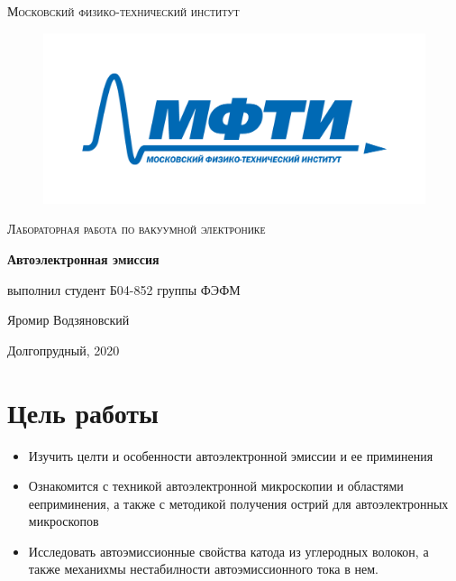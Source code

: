 \documentclass[a4paper]{article}
\begin{document}
\newcommand{\apple}{\char"F8FF}

\begin{titlepage}
	\centering
	\vspace{5cm}
    {\scshape\LARGE Московский физико-технический институт\par}
    
\begin{figure}[H]
\begin{center}
\includegraphics[scale = 0.4]{mipt_rus_text.png}
\label{default}
\end{center}
\end{figure}

	\vspace{3cm}
	{\scshape\Large Лабораторная работа по вакуумной электронике \par}
	\vspace{1cm}
    {\huge\bfseries  Автоэлектронная эмиссия \par}
	\vspace{1cm}
	\vfill
\begin{flushright}
	{\large выполнил студент Б04-852 группы ФЭФМ}\par
	\vspace{0.3cm}
	{\LARGE Яромир Водзяновский}
\end{flushright}
	
	\vfill
Долгопрудный, 2020
\end{titlepage}

\pagestyle{fancy} 
\fancyhead[C]{}
\fancyfoot[C]{ \noindent\rule{\textwidth}{0.4pt} \thepage }

\newpage


\section{Цель работы}

\begin{itemize}
	\item Изучить целти и особенности автоэлектронной эмиссии и ее приминения
	\item Ознакомится с техникой автоэлектронной микроскопии и областями ееприминения, а также 
	с методикой получения острий для автоэлектронных микроскопов
	\item Исследовать автоэмиссионные свойства катода из углеродных волокон, а также механихмы
	нестабилности автоэмиссионного тока в нем.
\end{itemize}
\end{document}

